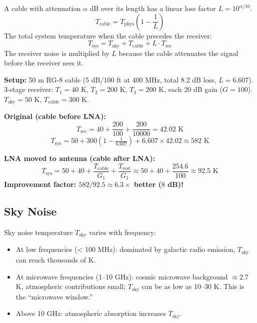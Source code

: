 \documentclass[10pt,letterpaper]{article}
\begin{document}
A cable with attenuation $\alpha$ dB over its length has a linear loss factor $L = 10^{\alpha/10}$.
\begin{equation}
  T_\mathrm{cable} = T_\mathrm{phys}\!\left(1 - \frac{1}{L}\right)
\end{equation}
The total system temperature when the cable precedes the receiver:
\begin{equation}
  T_\mathrm{sys} = T_\mathrm{sky} + T_\mathrm{cable} + L\cdot T_\mathrm{rec}
\end{equation}
The receiver noise is multiplied by $L$ because the cable attenuates the signal before the receiver sees it.

\begin{tcolorbox}[examplebox, title={HW5 P1 Example: LNA Placement Comparison}]
\textbf{Setup:} 50 m RG-8 cable (5 dB/100 ft at 400 MHz, total 8.2 dB loss, $L=6.607$). 3-stage receiver: $T_1=40$ K, $T_2=200$ K, $T_3=200$ K, each 20 dB gain ($G=100$). $T_\mathrm{sky}=50$ K, $T_\mathrm{cable}=300$ K.

\textbf{Original (cable before LNA):}
\[T_\mathrm{rec} = 40 + \frac{200}{100} + \frac{200}{10000} = 42.02\text{ K}\]
\[T_\mathrm{sys} = 50 + 300\!\left(1-\tfrac{1}{6.607}\right) + 6.607\times42.02 \approx 582\text{ K}\]

\textbf{LNA moved to antenna (cable after LNA):}
\[T_\mathrm{sys} = 50 + 40 + \frac{T_\mathrm{cable}}{G_1} + \frac{T_\mathrm{rest}}{G_1} \approx 50 + 40 + \frac{254.6}{100} \approx 92.5\text{ K}\]
\textbf{Improvement factor: $582/92.5 \approx 6.3\times$ better ($8$ dB)!}
\end{tcolorbox}

\subsection{Sky Noise}

Sky noise temperature $T_\mathrm{sky}$ varies with frequency:
\begin{itemize}[noitemsep]
  \item At low frequencies (< 100 MHz): dominated by galactic radio emission, $T_\mathrm{sky}$ can reach thousands of K.
  \item At microwave frequencies (1--10 GHz): cosmic microwave background $\approx 2.7$ K, atmospheric contributions small; $T_\mathrm{sky}$ can be as low as 10--30 K. This is the ``microwave window.''
  \item Above 10 GHz: atmospheric absorption increases $T_\mathrm{sky}$.
\end{itemize}
\end{document}
